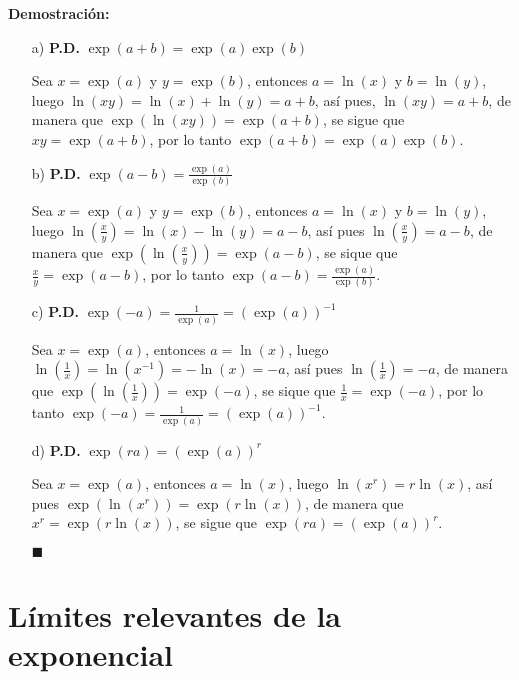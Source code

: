 \documentclass[pts12]{article}
\numberwithin{equation}{section}
\newcommand{\Col}{\color{ProcessBlue}}
\begin{document}
\begin{itemize}
\textbf{Demostración:}

\begin{enumerate}
\item[a)] \textbf{P.D.} $\exp(a+b)=\exp(a)\exp(b)$

Sea $x=\exp(a)$ y $y=\exp(b)$, entonces $a=\ln(x)$ y $b=\ln(y)$, luego $\ln(xy)=\ln(x)+\ln(y)=a+b$, 
así pues, $\ln(xy)=a+b$, de manera que $\exp(\ln(xy))=\exp(a+b)$, se sigue que $xy=\exp(a+b)$, por lo tanto $\exp(a+b)=\exp(a)\exp(b)$.

\item[b)] \textbf{P.D.} $\exp(a-b)=\frac{\exp(a)}{\exp(b)}$

Sea $x=\exp(a)$ y $y=\exp(b)$, entonces $a=\ln(x)$ y $b=\ln(y)$, luego $\ln\left(\frac{x}{y}\right)=\ln(x)-\ln(y)=a-b$, así pues $\ln\left(\frac{x}{y}\right)=a-b$, de manera que $\exp\left(\ln\left(\frac{x}{y}\right)\right)=\exp(a-b)$, se sique que $\frac{x}{y}=\exp(a-b)$, por lo tanto $\exp(a-b)=\frac{\exp(a)}{\exp(b)}$.

\item[c)] \textbf{P.D.} $\exp(-a)=\frac{1}{\exp(a)}=(\exp(a))^{-1}$

Sea $x=\exp(a)$, entonces $a=\ln(x)$, luego $\ln\left(\frac{1}{x}\right)=\ln(x^{-1})=-\ln(x)=-a$, así pues $\ln\left(\frac{1}{x}\right)=-a$, de manera que $\exp\left(\ln\left(\frac{1}{x}\right)\right)=\exp(-a)$, se sique que $\frac{1}{x}=\exp(-a)$, por lo tanto $\exp(-a)=\frac{1}{\exp(a)}=(\exp(a))^{-1}$.

\item[d)] \textbf{P.D.} $\exp(ra)=(\exp(a))^r$

Sea $x=\exp(a)$, entonces $a=\ln(x)$, luego $\ln(x^r)=r\ln(x)$, así pues $\exp(\ln(x^r))=\exp(r\ln(x))$, de manera que $x^r=\exp(r\ln(x))$, se sigue que $\exp(ra)=(\exp(a))^{r}$.

\begin{flushright}
$\blacksquare$
\end{flushright} 

\end{enumerate}

\end{itemize}

\section{\Col Límites relevantes de la exponencial}
\end{document}
